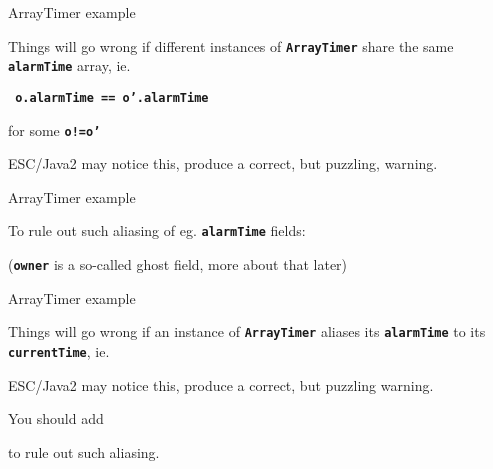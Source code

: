 \documentclass[
pdf,
nocolorBG,
slideColor,
erik,
]{prosper}
\newcommand{\code}[1]{{\rm \texttt{\textbf{\small #1}}}}
\begin{document}
\begin{slide}{ArrayTimer example}
\vspace*{-4ex}


Things will go wrong if different instances of \code{ArrayTimer}
share the same \code{alarmTime} array, ie.
\begin{alltt}\code{\scriptsize
  o.alarmTime == o'.alarmTime}

\end{alltt}
for some \code{o!=o'}

\medskip

ESC/Java2 may notice this, produce a correct, but puzzling, warning.


\end{slide}
\begin{slide}{ArrayTimer example}
\vspace*{-4ex}

To rule out such aliasing of eg. \code{alarmTime} fields:


{\scriptsize\rm (\texttt{\textbf{owner}} is a so-called ghost field, more 
about that later)}

\end{slide}




\begin{slide}{ArrayTimer example}
\vspace*{-4ex}

Things will go wrong if an instance of \code{ArrayTimer}
aliases its \code{alarmTime}  to its \code{currentTime}, ie.

ESC/Java2 may notice this, produce a correct, but puzzling warning.

\medskip

You should add
to rule out such aliasing.

\end{slide}
\end{document}
